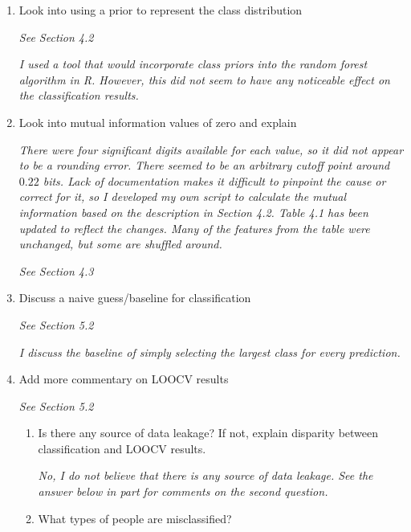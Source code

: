 \documentclass[12pt]{report}
\begin{document}
\begin{enumerate}
    \item Look into using a prior to represent the class distribution
    \par \textit{See Section 4.2}
    \par \textit{I used a tool that would incorporate class priors into the random forest algorithm in R.  However, this did not seem to have any noticeable effect on the classification results.}
	\item Look into mutual information values of zero and explain 

    	\par \textit{There were four significant digits available for each value, so it did not appear to be a rounding error.
    		  There seemed to be an arbitrary cutoff point around $0.22$ bits.
    		  Lack of documentation makes it difficult to pinpoint the cause or correct for it, so I developed my own script to calculate the mutual information based on the description in Section 4.2.
    		  Table 4.1 has been updated to reflect the changes.
    		  Many of the features from the table were unchanged, but some are shuffled around.}
	\par \textit{See Section 4.3}


    \item Discuss a naive guess/baseline for classification
    \par \textit{See Section 5.2}    
    \par \textit{I discuss the baseline of simply selecting the largest class for every prediction.}    
	\item Add more commentary on LOOCV results
	\par \textit{See Section 5.2}
    \begin{enumerate}
   	    \item Is there any source of data leakage? If not, explain disparity between classification and LOOCV results.
   	    \par \textit{No, I do not believe that there is any source of data leakage.  See the answer below in part  for comments on the second question.}
		\item What types of people are misclassified?




\end{enumerate}
\end{enumerate}
\end{document}
